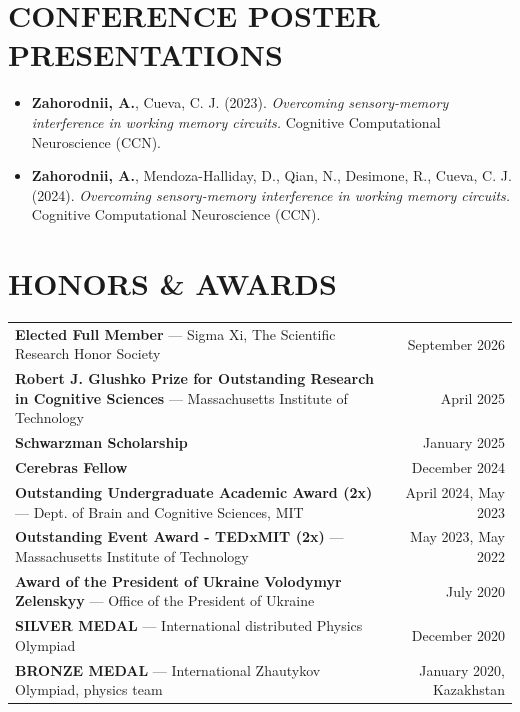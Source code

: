 \documentclass[letterpaper,11pt]{article}
\newcommand{\resumeItem}[1]{
  \item\small{{#1 \vspace{-3pt}}}
}
\newcommand{\resumeSubHeadingListStart}{\begin{itemize}[leftmargin=0in,label={}]}
\newcommand{\resumeSubHeadingListEnd}{\end{itemize}}
\begin{document}
\section{CONFERENCE POSTER PRESENTATIONS}
\resumeSubHeadingListStart
  \resumeItem{\textbf{Zahorodnii, A.}, Cueva, C. J. (2023). \textit{Overcoming sensory-memory interference in working memory circuits.} Cognitive Computational Neuroscience (CCN).}

  \resumeItem{\textbf{Zahorodnii, A.}, Mendoza-Halliday, D., Qian, N., Desimone, R., Cueva, C. J. (2024). \textit{Overcoming sensory-memory interference in working memory circuits.} Cognitive Computational Neuroscience (CCN).}

\resumeSubHeadingListEnd

\section{HONORS \& AWARDS}
{\small
\begin{tabularx}{\textwidth}{@{}Xr@{}}
    \textbf{Elected Full Member} --- Sigma Xi, The Scientific Research Honor Society & {\color{dark-grey} September 2026}\\[2pt]
    \textbf{Robert J. Glushko Prize for Outstanding Research in Cognitive Sciences} --- Massachusetts Institute of Technology & {\color{dark-grey} April 2025}\\[2pt]
    \textbf{Schwarzman Scholarship} & {\color{dark-grey} January 2025}\\[2pt]
    \textbf{Cerebras Fellow} & {\color{dark-grey} December 2024}\\[2pt]
    \textbf{Outstanding Undergraduate Academic Award (2x)} --- Dept. of Brain and Cognitive Sciences, MIT & {\color{dark-grey} April 2024, May 2023}\\[2pt]
    \textbf{Outstanding Event Award - TEDxMIT (2x)} --- Massachusetts Institute of Technology & {\color{dark-grey} May 2023, May 2022}\\[2pt]
    \textbf{Award of the President of Ukraine Volodymyr Zelenskyy} --- Office of the President of Ukraine & {\color{dark-grey} July 2020}\\[2pt]
    \textbf{SILVER MEDAL} --- International distributed Physics Olympiad & {\color{dark-grey} December 2020}\\[2pt]
    \textbf{BRONZE MEDAL} --- International Zhautykov Olympiad, physics team & {\color{dark-grey} January 2020, Kazakhstan}\\
\end{tabularx}
}
\end{document}
